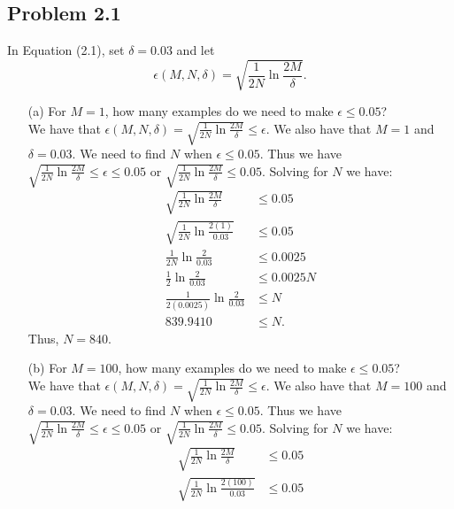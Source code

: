 \documentclass[a4paper]{article}
\begin{document}

\subsection{Problem 2.1} In Equation (2.1), set $\delta = 0.03$ and let
\begin{equation*}
    \epsilon(M, N, \delta) = \sqrt{\frac{1}{2N} \ln \frac{2M}{\delta}}.
\end{equation*}
\begin{itemize}
    \item[(a)] For $M = 1$, how many examples do we need to make $\epsilon \leq 0.05$?\\
    We have that $\epsilon(M, N, \delta) = \sqrt{\frac{1}{2N} \ln \frac{2M}{\delta}} \leq 
    \epsilon$.  We also have that $M=1$ and $\delta = 0.03$.  We need to find $N$ when 
    $\epsilon \leq 0.05$.  Thus we have $\sqrt{\frac{1}{2N} \ln \frac{2M}{\delta}} \leq 
    \epsilon \leq 0.05$ or $\sqrt{\frac{1}{2N} \ln \frac{2M}{\delta}} \leq 0.05$.  Solving 
    for $N$ we have:
    \begin{align*}
        \sqrt{\frac{1}{2N} \ln \frac{2M}{\delta}} &\leq 0.05\\
        \sqrt{\frac{1}{2N} \ln \frac{2(1)}{0.03}} &\leq 0.05\\
        \frac{1}{2N} \ln \frac{2}{0.03} &\leq 0.0025\\
        \frac{1}{2}\ln \frac{2}{0.03} &\leq 0.0025N\\
        \frac{1}{2(0.0025)}\ln \frac{2}{0.03} &\leq N\\
        839.9410 &\leq N.
    \end{align*}
    Thus, $N = 840$.
    \item[(b)] For $M = 100$, how many examples do we need to make $\epsilon \leq 0.05$?\\
    We have that $\epsilon(M, N, \delta) = \sqrt{\frac{1}{2N} \ln \frac{2M}{\delta}} \leq 
    \epsilon$.  We also have that $M=100$ and $\delta = 0.03$.  We need to find $N$ when 
    $\epsilon \leq 0.05$.  Thus we have $\sqrt{\frac{1}{2N} \ln \frac{2M}{\delta}} \leq 
    \epsilon \leq 0.05$ or $\sqrt{\frac{1}{2N} \ln \frac{2M}{\delta}} \leq 0.05$.  Solving 
    for $N$ we have:
    \begin{align*}
        \sqrt{\frac{1}{2N} \ln \frac{2M}{\delta}} &\leq 0.05\\
        \sqrt{\frac{1}{2N} \ln \frac{2(100)}{0.03}} &\leq 0.05\\

\end{align*}
\end{itemize}
\end{document}
